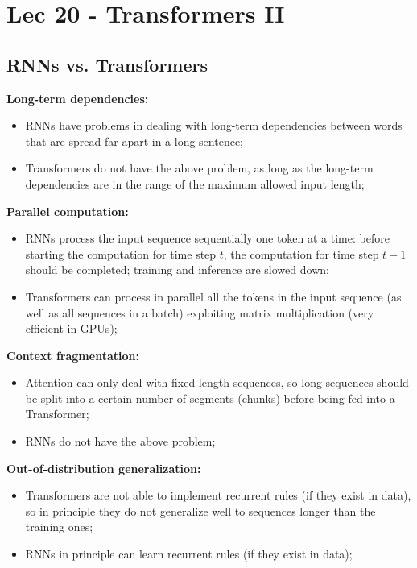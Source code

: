 \chapter{Lec 20 - Transformers II}

\section{RNNs vs. Transformers}
\textbf{Long-term dependencies:}
\begin{itemize}
    \item RNNs have problems in dealing with long-term dependencies between words that are spread far apart in a long sentence;

    \item Transformers do not have the above problem, as long as the long-term dependencies are in the range of the maximum allowed input length;
\end{itemize}
\textbf{Parallel computation:}
\begin{itemize}
    \item RNNs process the input sequence sequentially one token at a time: before starting the computation for time step $t$, the computation for time step $t-1$ should be completed; training and inference are slowed down;

    \item Transformers can process in parallel all the tokens in the input sequence (as well as all sequences in a batch) exploiting matrix multiplication (very efficient in GPUs);
\end{itemize}
\textbf{Context fragmentation:}
\begin{itemize}
    \item Attention can only deal with fixed-length sequences, so long sequences should be split into a certain number of segments (chunks) before being fed into a Transformer;

    \item RNNs do not have the above problem;
\end{itemize}
\textbf{Out-of-distribution generalization:}
\begin{itemize}
    \item Transformers are not able to implement recurrent rules (if they exist in data), so in principle they do not generalize well to sequences longer than the training ones;

    \item RNNs in principle can learn recurrent rules (if they exist in data);
\end{itemize}
